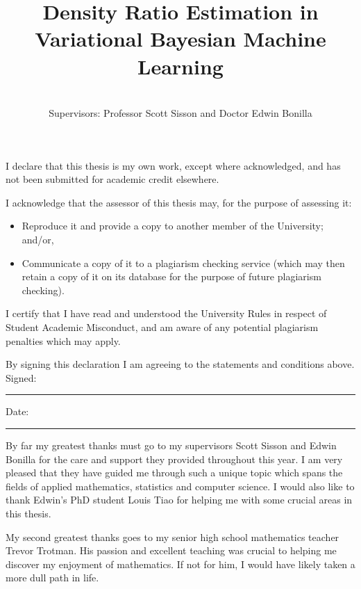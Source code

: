 \documentclass[honours,12pt, twoside]{unswthesis}
\title{Density Ratio Estimation in Variational Bayesian Machine Learning}
\author{\Authornameonly\\{\bigskip}Supervisors: Professor Scott Sisson and Doctor Edwin Bonilla}
\numberwithin{equation}{section}
\theoremstyle{definition}
\begin{document}
\beforepreface

\afterpage{\clearpage}



\vskip 10pc \noindent I declare that this thesis is my
own work, except where acknowledged, and has not been submitted for
academic credit elsewhere. 

\vskip 2pc  \noindent I acknowledge that the assessor of this
thesis may, for the purpose of assessing it:
\begin{itemize}
\item Reproduce it and provide a copy to another member of the University; and/or,
\item Communicate a copy of it to a plagiarism checking service (which may then retain a copy of it on its database for the purpose of future plagiarism checking).
\end{itemize}

\vskip 2pc \noindent I certify that I have read and understood the University Rules in
respect of Student Academic Misconduct, and am aware of any potential plagiarism penalties which may 
apply.\vspace{24pt}

\vskip 2pc \noindent By signing 
this declaration I am
agreeing to the statements and conditions above.
\vskip 2pc \noindent
Signed: \rule{7cm}{0.25pt} \hfill Date: \rule{4cm}{0.25pt} \newline
\vskip 1pc

\afterpage{\cleardoublepage}




{\bigskip}By far my greatest thanks must go to my supervisors Scott Sisson and Edwin Bonilla for the care and support they provided throughout this year. I am very pleased that they have guided me through such a unique topic which spans the fields of applied mathematics, statistics and computer science. I would also like to thank Edwin's PhD student Louis Tiao for helping me with some crucial areas in this thesis.

{\bigskip\noindent}My second greatest thanks goes to my senior high school mathematics teacher Trevor Trotman. His passion and excellent teaching was crucial to helping me discover my enjoyment of mathematics. If not for him, I would have likely taken a more dull path in life.
\end{document}

